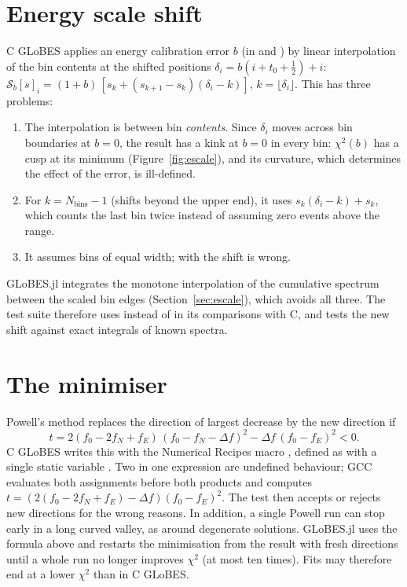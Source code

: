 \section{Energy scale shift}\label{sec:cdiff-escale}

C GLoBES applies an energy calibration error $b$ (in 
and ) by linear interpolation of the bin contents at
the shifted positions $\delta_i=b(i+t_0+\frac12)+i$:
$\mathcal S_b[s]_i=(1+b)\,[s_k+(s_{k+1}-s_k)(\delta_i-k)]$, $k=\lfloor\delta_i\rfloor$.
This has three problems:
\begin{enumerate}
\item The interpolation is between bin \emph{contents}. Since $\delta_i$ moves
  across bin boundaries at $b=0$, the result has a kink at $b=0$ in every bin:
  $\chi^2(b)$ has a cusp at its minimum (Figure~\ref{fig:escale}), and its
  curvature, which determines the effect of the error, is ill-defined.
\item For $k=N_\text{bins}-1$ (shifts beyond the upper end), it uses
  $s_k(\delta_i-k)+s_k$, which counts the last bin twice instead of assuming
  zero events above the range.
\item It assumes bins of equal width; with  the shift is wrong.
\end{enumerate}
GLoBES.jl integrates the monotone interpolation of the cumulative spectrum
between the scaled bin edges (Section~\ref{sec:escale}), which avoids all three.
The test suite therefore uses  instead of
 in its comparisons with C, and tests the new shift
against exact integrals of known spectra.

\section{The minimiser}\label{sec:cdiff-powell}

Powell's method replaces the direction of largest decrease by the new
direction if~\cite{NR}
\begin{equation}
t = 2(f_0-2f_N+f_E)\,(f_0-f_N-\Delta f)^2 - \Delta f\,(f_0-f_E)^2 < 0 .
\end{equation}
C GLoBES writes this with the Numerical Recipes macro
, defined as  with a single
static variable . Two  in one expression are undefined
behaviour; GCC evaluates both assignments before both products and computes
$t=(2(f_0-2f_N+f_E)-\Delta f)(f_0-f_E)^2$. The test then accepts or rejects
new directions for the wrong reasons. In addition, a single Powell run can stop
early in a long curved valley, as around degenerate solutions. GLoBES.jl uses
the formula above and restarts the minimisation from the result with fresh
directions until a whole run no longer improves $\chi^2$ (at most ten times).
Fits may therefore end at a lower $\chi^2$ than in C GLoBES.

